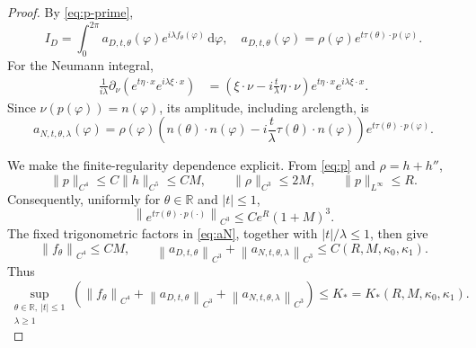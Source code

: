 \documentclass[12pt]{article}
\newcommand{\R}{\mathbb{R}}
\numberwithin{equation}{section}
\numberwithin{equation}{section}
\newcommand{\pd}{\partial}
\newcommand{\dd}{\,\mathrm{d}}
\begin{document}
\begin{proof}
By \eqref{eq:p-prime},
\begin{equation*}\label{eq:I-D-param}
I_D
=\int_0^{2\pi}
a_{D,t,\theta}(\varphi)
e^{i\lambda f_\theta(\varphi)}\dd\varphi,
\quad
a_{D,t,\theta}(\varphi)
=\rho(\varphi)e^{t\tau(\theta)\cdot p(\varphi)}.
\end{equation*}
For the Neumann integral,
\begin{align*}
\frac1{i\lambda}\pd_\nu
\left(e^{t\eta\cdot x}e^{i\lambda\xi\cdot x}\right)
&=\left(
\xi\cdot\nu-i\frac{t}{\lambda}\eta\cdot\nu
\right)
e^{t\eta\cdot x}e^{i\lambda\xi\cdot x}.
\label{eq:N-amplitude}
\end{align*}
Since $\nu(p(\varphi))=n(\varphi)$, its amplitude, including arclength, is
\begin{equation}\label{eq:aN}
a_{N,t,\theta,\lambda}(\varphi)
=\rho(\varphi)
\left(
n(\theta)\cdot n(\varphi)
-i\frac{t}{\lambda}\tau(\theta)\cdot n(\varphi)
\right)
e^{t\tau(\theta)\cdot p(\varphi)}.
\end{equation}

We make the finite-regularity dependence explicit. From
\eqref{eq:p} and $\rho=h+h''$,
\begin{equation*}\label{eq:p-rho-regularity}
 \|p\|_{C^4}\le C\|h\|_{C^5}\le CM,
 \qquad
 \|\rho\|_{C^3}\le2M,
 \qquad
 \|p\|_{L^\infty}\le R.
\end{equation*}
Consequently, uniformly for $\theta\in\R$ and $|t|\le1$,
\begin{equation*}\label{eq:exponential-amplitude-bound}
 \left\|e^{t\tau(\theta)\cdot p(\cdot)}\right\|_{C^3}
 \le C e^R(1+M)^3.
\end{equation*}
The fixed trigonometric factors in \eqref{eq:aN}, together with
$|t|/\lambda\le1$, then give
\[
 \left\|f_\theta\right\|_{C^4}\le CM,
 \qquad
 \left\|a_{D,t,\theta}\right\|_{C^3}
 +\left\|a_{N,t,\theta,\lambda}\right\|_{C^3}
 \le C\left(R,M,\kappa_0,\kappa_1\right).
\]
Thus
\begin{equation*}\label{eq:phase-amplitude-K}
\sup_{\substack{\theta\in\R,\ |t|\leq1\\ \lambda\geq1}}
\left(
\left\|f_\theta\right\|_{C^4}
+\left\|a_{D,t,\theta}\right\|_{C^3}
+\left\|a_{N,t,\theta,\lambda}\right\|_{C^3}
\right)
\leq K_*=K_*\left(R,M,\kappa_0,\kappa_1\right).
\end{equation*}


\end{proof}
\end{document}
